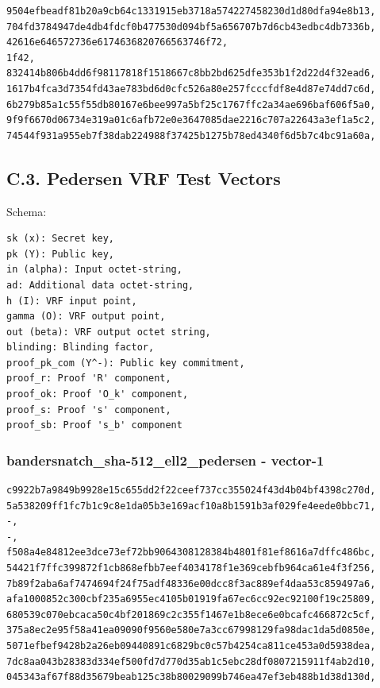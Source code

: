 \documentclass[
]{article}
\begin{document}
\begin{verbatim}
9504efbeadf81b20a9cb64c1331915eb3718a574227458230d1d80dfa94e8b13,
704fd3784947de4db4fdcf0b477530d094bf5a656707b7d6cb43edbc4db7336b,
42616e646572736e6174636820766563746f72,
1f42,
832414b806b4dd6f98117818f1518667c8bb2bd625dfe353b1f2d22d4f32ead6,
1617b4fca3d7354fd43ae783bd6d0cfc526a80e257fcccfdf8e4d87e74dd7c6d,
6b279b85a1c55f55db80167e6bee997a5bf25c1767ffc2a34ae696baf606f5a0,
9f9f6670d06734e319a01c6afb72e0e3647085dae2216c707a22643a3ef1a5c2,
74544f931a955eb7f38dab224988f37425b1275b78ed4340f6d5b7c4bc91a60a,
\end{verbatim}

\subsection{C.3. Pedersen VRF Test
Vectors}\label{c.3.-pedersen-vrf-test-vectors}

Schema:

\begin{verbatim}
sk (x): Secret key,
pk (Y): Public key,
in (alpha): Input octet-string,
ad: Additional data octet-string,
h (I): VRF input point,
gamma (O): VRF output point,
out (beta): VRF output octet string,
blinding: Blinding factor,
proof_pk_com (Y^-): Public key commitment,
proof_r: Proof 'R' component,
proof_ok: Proof 'O_k' component,
proof_s: Proof 's' component,
proof_sb: Proof 's_b' component
\end{verbatim}

\subsubsection{bandersnatch\_sha-512\_ell2\_pedersen -
vector-1}\label{bandersnatch_sha-512_ell2_pedersen---vector-1}

\begin{verbatim}
c9922b7a9849b9928e15c655dd2f22ceef737cc355024f43d4b04bf4398c270d,
5a538209ff1fc7b1c9c8e1da05b3e169acf10a8b1591b3af029fe4eede0bbc71,
-,
-,
f508a4e84812ee3dce73ef72bb9064308128384b4801f81ef8616a7dffc486bc,
54421f7ffc399872f1cb868efbb7eef4034178f1e369cebfb964ca61e4f3f256,
7b89f2aba6af7474694f24f75adf48336e00dcc8f3ac889ef4daa53c859497a6,
afa1000852c300cbf235a6955ec4105b01919fa67ec6cc92ec92100f19c25809,
680539c070ebcaca50c4bf201869c2c355f1467e1b8ece6e0bcafc466872c5cf,
375a8ec2e95f58a41ea09090f9560e580e7a3cc67998129fa98dac1da5d0850e,
5071efbef9428b2a26eb09440891c6829bc0c57b4254ca811ce453a0d5938dea,
7dc8aa043b28383d334ef500fd7d770d35ab1c5ebc28df0807215911f4ab2d10,
045343af67f88d35679beab125c38b80029099b746ea47ef3eb488b1d38d130d,
\end{verbatim}
\end{document}
